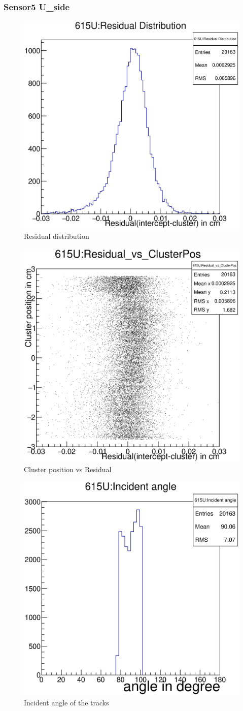 \documentclass[12pt]{article}
\begin{document}
	\subsubsection{Sensor5 U\_side}
	\begin{multicols}{3}
		
		\begin{figure}[H]
			\includegraphics[width=.3\textwidth]{615U:residualplot.eps}	
			\caption{Residual distribution}	
			\label{fig1}	
		\end{figure}
		\begin{figure}[H]
			\includegraphics[width=.3\textwidth]{615U:residual_vs_clusterpos.eps}	
			\caption{Cluster position vs Residual}	
			\label{fig2}	
		\end{figure}
		\begin{figure}[H]
			\includegraphics[width=.3\textwidth]{615U:incident_angle.eps}	
			\caption{Incident angle of the tracks}	
			\label{fig2}	
		\end{figure}
	\end{multicols}
	
\end{document}
